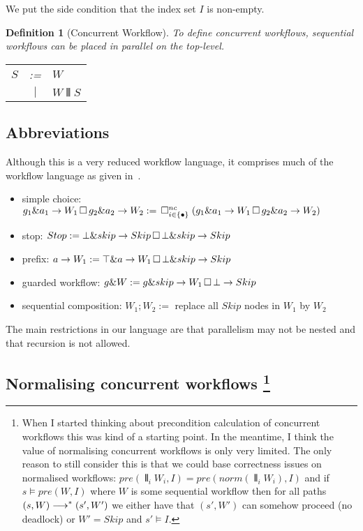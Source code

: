 \documentclass[11pt]{article}
\newcommand{\TODO}[1]{{\color{red} #1}}
\newtheorem{definition}{Definition}
\begin{document}
We put the side condition that the index set $I$ is non-empty.

\begin{definition}[Concurrent Workflow]
To define concurrent workflows, sequential workflows can be placed in parallel on the top-level.

\begin{tabular}{c c l}
  $S$ & :=  & $W$ \\
      & $|$ & $W \interleave S$    	 
\end{tabular}
\end{definition}

\subsection{Abbreviations}

Although this is a very reduced workflow language, it comprises much of the workflow language as given in~\cite{Wang2012}.

\begin{itemize}
  \item simple choice: $g_1 \& a_1 \rightarrow W_1 \, \Box \, g_2 \& a_2 \rightarrow W_2 := \, \Box^{nc}_{i \in \{\bullet\}}\; (g_1 \& a_1 \rightarrow W_1 \, \Box \, g_2 \& a_2 \rightarrow W_2)$
  \item stop: $Stop := \bot \& skip \rightarrow Skip \, \Box \, \bot \& skip \rightarrow Skip$
  \item prefix: $a \rightarrow W_1 := \top \& a \rightarrow W_1 \, \Box \, \bot \& skip \rightarrow Skip$
  \item guarded workflow: $g \& W := g \& skip \rightarrow W_1 \, \Box \, \bot \rightarrow Skip$
  \item sequential composition: $W_1 ; W_2 :=$ replace all $Skip$ nodes in $W_1$ by $W_2$
\end{itemize}

The main restrictions in our language are that parallelism may not be nested and that recursion is not allowed. 

\subsection[Normalising concurrent workflows]{Normalising concurrent workflows
\footnote{\TODO{When I started thinking about precondition calculation of concurrent workflows this was kind of a starting point. In the meantime, I think the value of normalising concurrent workflows is only very limited. The only reason to still consider this is that we could base correctness issues on normalised workflows: $pre(\interleave_i W_i,I) = pre(norm(\interleave_i W_i),I)$ and if $s \models pre(W,I)$ where $W$ is some sequential workflow then for all paths $(s,W) \stackrel{}{\longrightarrow}^* (s',W')$ we either have that $(s',W')$ can somehow proceed (no deadlock) or $W' = Skip$ and $s' \models I$.}}}
\end{document}
